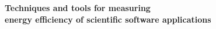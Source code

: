 \documentclass[portrait,a1,final]{a0poster} %
\begin{document}
\thispagestyle{empty} %


\begin{minipage}[t]{1\linewidth} %
\vspace{0pt} %

\vspace{0.008\linewidth} %

\begin{minipage}[t]{0.28\linewidth} %
\vspace{0pt} %


\end{minipage} %
\begin{minipage}[t]{0.7\linewidth} %
\vspace{0pt} %




{\renewcommand{\baselinestretch}{0.6} %
\textcolor{aaltoGreen}{\Huge{\bfseries{\textsf{Techniques and tools for measuring \\energy efficiency of scientific software applications}}}} %
\par} %




\end{minipage}
\end{minipage}
\end{document}
